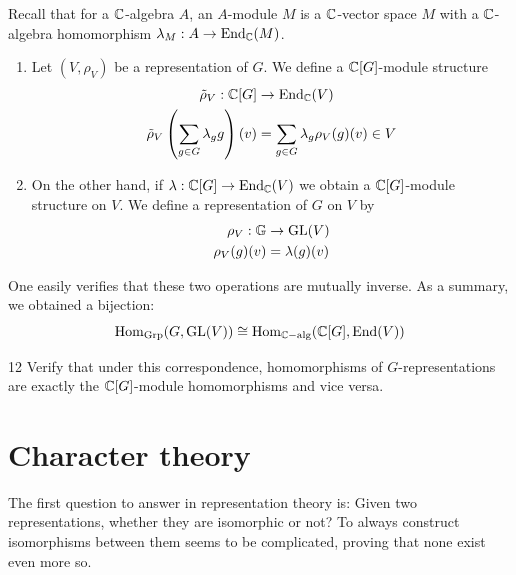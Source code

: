 \documentclass[twoside = false,	%
		headsepline,		%
		parskip = true,
		]{scrbook}						%
\begin{document}
        Recall that for a $\mathbb C$-algebra $A$, an $A$-module $M$ is a $\mathbb C$-vector space $M$ with a $\mathbb C$-algebra homomorphism $\lambda_M: A \to \mathrm{End}_\mathbb C(M)$.
        \begin{enumerate}
            \item Let $(V,\rho_V)$ be a representation of $G$. We define a $\mathbb C[G]$-module structure
            \begin{equation*}
            \begin{split}
                \tilde{\rho}_V: \mathbb C[G] &\to \mathrm{End}_\mathbb C(V) \\
                                \tilde{\rho}_V\left( \sum_{g \in G} \lambda_g g\right)(v) &= \sum_{g \in G} \lambda_g \rho_V(g)(v) \in V
            \end{split}
            \end{equation*}
            \item On the other hand, if $\lambda: \mathbb C[G] \to \mathrm{End}_\mathbb C(V)$ we obtain a $\mathbb C[G]$-module structure on $V$. We define a representation of $G$ on $V$ by
            \begin{equation*}
            \begin{split}
                \rho_V: \mathbb G &\to \mathrm{GL}(V) \\  
                        \rho_V(g)(v) &= \lambda(g)(v)
            \end{split}
            \end{equation*}
        \end{enumerate}
        One easily verifies that these two operations are mutually inverse. As a summary, we obtained a bijection:
        \begin{equation*}
            \mathrm{Hom}_{\mathrm{Grp}}(G,\mathrm{GL}(V)) \cong \mathrm{Hom}_{\mathbb C\mathrm{-alg}}(\mathbb C[G],\mathrm{End}(V))
        \end{equation*}
        \begin{exercise}{}{12}
            Verify that under this correspondence, homomorphisms of $G$-representations are exactly the $\mathbb C[G]$-module homomorphisms and vice versa.
        \end{exercise}
%            

\section{Character theory}
    The first question to answer in representation theory is: Given two representations, whether they are isomorphic or not? To always construct isomorphisms between them seems to be complicated, proving that none exist even more so.
    
\end{document}
